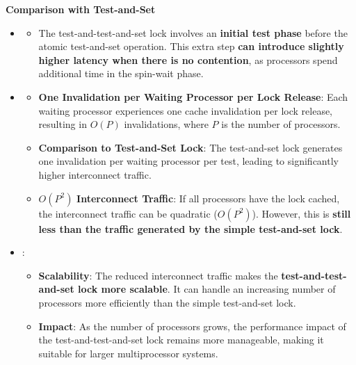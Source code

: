 \highspace
\begin{flushleft}
    \textcolor{Green3}{ \textbf{Comparison with Test-and-Set}}
\end{flushleft}
\begin{itemize}
    \item {}
    \begin{itemize}
        \item The test-and-test-and-set lock involves an \textbf{initial test phase} before the atomic test-and-set operation. This extra step \textbf{can introduce slightly higher latency when there is no contention}, as processors spend additional time in the spin-wait phase.
    \end{itemize}

    \item {}
    \begin{itemize}
        \item \textbf{One Invalidation per Waiting Processor per Lock Release}: Each waiting processor experiences one cache invalidation per lock release, resulting in $O(P)$ invalidations, where $P$ is the number of processors.
        \item \textbf{Comparison to Test-and-Set Lock}: The test-and-set lock generates one invalidation per waiting processor per test, leading to significantly higher interconnect traffic.
        \item $O(P^{2})$ \textbf{Interconnect Traffic}: If all processors have the lock cached, the interconnect traffic can be quadratic ($O\left(P^{2}\right)$). However, this is \textbf{still less than the traffic generated by the simple test-and-set lock}.
    \end{itemize}

    \item {}:
    \begin{itemize}
        \item \textbf{Scalability}: The reduced interconnect traffic makes the \textbf{test-and-test-and-set lock more scalable}. It can handle an increasing number of processors more efficiently than the simple test-and-set lock.
        \item \textbf{Impact}: As the number of processors grows, the performance impact of the test-and-test-and-set lock remains more manageable, making it suitable for larger multiprocessor systems.
    \end{itemize}


\end{itemize}
